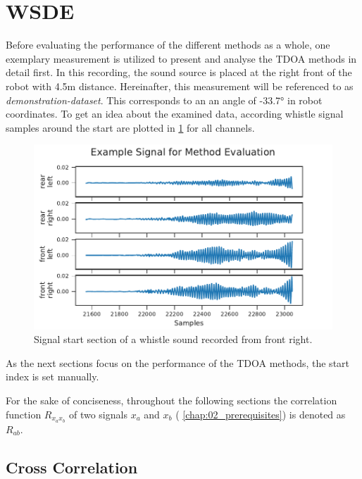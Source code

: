 \section{\acl{WSDE}}
\label{sec:04_tdoaSingle}

Before evaluating the performance of the different methods as a whole,
one exemplary measurement is utilized
to present and analyse the \ac{TDOA} methods in detail first.
In this recording, the sound source is placed at the right front
of the robot with 4.5\si{m} distance.
Hereinafter, this measurement will be referenced to as \textit{demonstration-dataset}.
This corresponds to an an angle of -33.7\si{\degree} in robot coordinates.
To get an idea about the examined data, according whistle signal samples around the
start are plotted in \cref{fig:04_tdoaSignal} for all channels.
\begin{figure}[ht]
	\centering
		\includegraphics[]{figures/evaluation/cc_frontRight_1_signal}
	\caption{Signal start section of a whistle sound recorded from front right.}
	\label{fig:04_tdoaSignal}
\end{figure}

As the next sections focus on the performance of the \ac{TDOA} methods,
the start index is set manually.

For the sake of conciseness, throughout the following sections the correlation
function $R_{x_ax_b}$ of two signals $x_a$ and $x_b$  (\cf
\cref{chap:02_prerequisites}) is denoted as $R_{ab}$.


\subsection{Cross Correlation}
\label{subsec:04_ccSingle}

